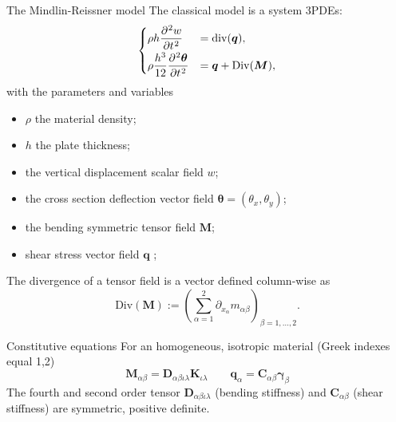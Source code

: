 \documentclass{beamer}
\begin{document}
\begin{frame}{The Mindlin-Reissner model}
The classical model is a system 3PDEs:
\begin{equation*}
\begin{cases}
\displaystyle \rho h \diffp[2]{w}{t} &= \mathrm{div}(\bm{q}),  \vspace{1mm}\\
\displaystyle \rho\frac{h^3}{12} \diffp[2]{\bm \theta}{t} &= \bm{q} + \mathrm{Div}(\bm M), \\
\end{cases}
\end{equation*}
with the parameters and variables
\begin{itemize}
	\item $\rho$ the material density; \\
	\item $h$ the plate thickness; \\
	\item the vertical displacement scalar field $w$; \\
	\item the cross section deflection vector field $\bm \theta = (\theta_x, \theta_y)$; \\
	\item the bending symmetric tensor field $\bm{M}$;\\
	\item shear stress vector field $\bm{q}$ ;\\
\end{itemize}
The divergence of a tensor field is a vector defined column-wise as
\begin{equation*}
\mathrm{Div}(\bm M) := \left( \sum_{\alpha = 1}^2 \partial_{x_\alpha} m_{\alpha \beta} \right)_{\beta = 1, \dots, 2}.
\end{equation*}
\end{frame}


\begin{frame}{Constitutive equations}
For an homogeneous, isotropic material (Greek indexes equal 1,2)
\begin{equation*}
\bm{M}_{\alpha \beta} = \bm{D}_{\alpha \beta \iota \lambda} \bm{K}_{\iota \lambda}  \qquad \bm{q}_{\alpha} = \bm{C}_{\alpha \beta} \bm{\gamma}_{\beta}
\end{equation*}
The fourth and second order tensor $\bm{D}_{\alpha \beta \iota \lambda}$ (bending stiffness) and $\bm{C}_{\alpha \beta}$ (shear stiffness) are symmetric, positive definite. \\
\vspace{5mm}
\end{frame}
\end{document}
